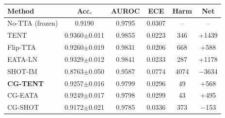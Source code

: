\begin{tabular}{@{}lccccc@{}}
\toprule
Method & Acc. & AUROC & ECE & Harm & Net \\
\midrule
No-TTA (frozen) & 0.9190 & 0.9795 & 0.0307 & -- & -- \\
TENT & 0.9360$\pm$0.011 & 0.9855 & 0.0223 & 346 & +1439 \\
Flip-TTA & 0.9260$\pm$0.019 & 0.9831 & 0.0206 & 668 & +588 \\
EATA-LN & 0.9329$\pm$0.012 & 0.9841 & 0.0233 & 287 & +1178 \\
SHOT-IM & 0.8763$\pm$0.050 & 0.9587 & 0.0774 & 4074 & $-$3634 \\
\textbf{CG-TENT} & 0.9257$\pm$0.016 & 0.9799 & 0.0296 & 49 & +568 \\
CG-EATA & 0.9249$\pm$0.017 & 0.9798 & 0.0299 & 43 & +495 \\
CG-SHOT & 0.9172$\pm$0.021 & 0.9785 & 0.0336 & 373 & $-$153 \\
\bottomrule
\end{tabular}